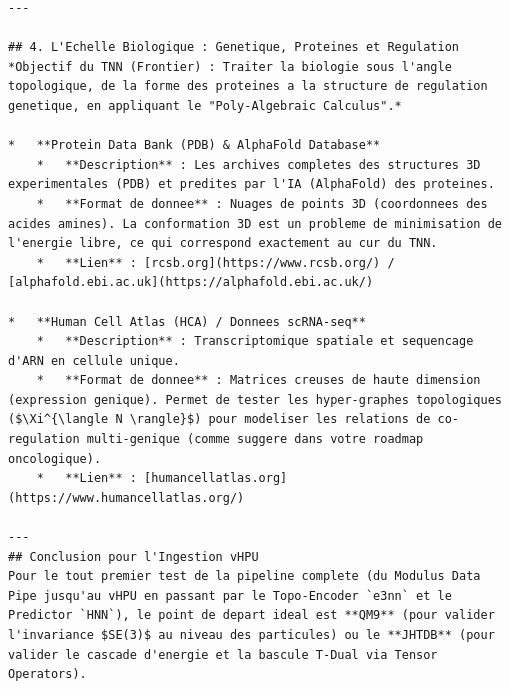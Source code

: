 \documentclass[11pt,a4paper]{article}
\begin{document}
\begin{lstlisting}[language={}, caption={}, basicstyle=\ttfamily\footnotesize, breaklines=true]
---

## 4. L'Echelle Biologique : Genetique, Proteines et Regulation
*Objectif du TNN (Frontier) : Traiter la biologie sous l'angle topologique, de la forme des proteines a la structure de regulation genetique, en appliquant le "Poly-Algebraic Calculus".*

*   **Protein Data Bank (PDB) & AlphaFold Database**
    *   **Description** : Les archives completes des structures 3D experimentales (PDB) et predites par l'IA (AlphaFold) des proteines.
    *   **Format de donnee** : Nuages de points 3D (coordonnees des acides amines). La conformation 3D est un probleme de minimisation de l'energie libre, ce qui correspond exactement au cur du TNN.
    *   **Lien** : [rcsb.org](https://www.rcsb.org/) / [alphafold.ebi.ac.uk](https://alphafold.ebi.ac.uk/)

*   **Human Cell Atlas (HCA) / Donnees scRNA-seq**
    *   **Description** : Transcriptomique spatiale et sequencage d'ARN en cellule unique.
    *   **Format de donnee** : Matrices creuses de haute dimension (expression genique). Permet de tester les hyper-graphes topologiques ($\Xi^{\langle N \rangle}$) pour modeliser les relations de co-regulation multi-genique (comme suggere dans votre roadmap oncologique).
    *   **Lien** : [humancellatlas.org](https://www.humancellatlas.org/)

---
## Conclusion pour l'Ingestion vHPU
Pour le tout premier test de la pipeline complete (du Modulus Data Pipe jusqu'au vHPU en passant par le Topo-Encoder `e3nn` et le Predictor `HNN`), le point de depart ideal est **QM9** (pour valider l'invariance $SE(3)$ au niveau des particules) ou le **JHTDB** (pour valider le cascade d'energie et la bascule T-Dual via Tensor Operators).

\end{lstlisting}
\end{document}
